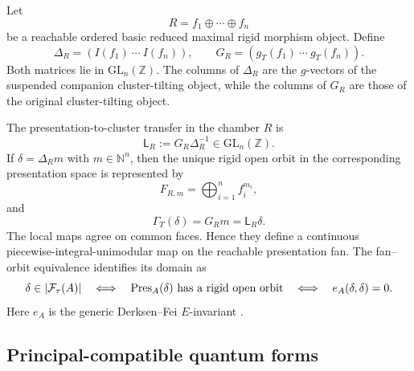 Let
\[
 R=f_1\oplus\cdots\oplus f_n
\]
be a reachable ordered basic reduced maximal rigid morphism object.  Define
\begin{equation}
 \Delta_R=(I(f_1)\ \cdots\ I(f_n)),
 \qquad
 G_R=(g_T(f_1)\ \cdots\ g_T(f_n)).
 \label{eq:Delta-G}
\end{equation}
Both matrices lie in $\mathrm{GL}_n(\mathbb Z)$.  The columns of $\Delta_R$
are the $g$-vectors of the suspended companion cluster-tilting object, while
the columns of $G_R$ are those of the original cluster-tilting object.

The presentation-to-cluster transfer in the chamber $R$ is
\begin{equation}
 \mathsf L_R:=G_R\Delta_R^{-1}\in\mathrm{GL}_n(\mathbb Z).
 \label{eq:chamber-transfer}
\end{equation}
If $\delta=\Delta_Rm$ with $m\in\mathbb N^n$, then the unique rigid open
orbit in the corresponding presentation space is represented by
\[
 F_{R,m}=\bigoplus_{i=1}^nf_i^{m_i},
\]
and
\begin{equation}
 \Gamma_T(\delta)=G_Rm=\mathsf L_R\delta.
 \label{eq:fan-transport}
\end{equation}
The local maps agree on common faces.  Hence they define a continuous
piecewise-integral-unimodular map on the reachable presentation fan.  The
fan--orbit equivalence identifies its domain as
\begin{equation}
 \delta\in\lvert\mathcal F_\tau(A)\rvert
 \quad\Longleftrightarrow\quad
 \operatorname{Pres}_A(\delta)\text{ has a rigid open orbit}
 \quad\Longleftrightarrow\quad
 e_A(\delta,\delta)=0.
 \label{eq:fan-orbit}
\end{equation}
Here $e_A$ is the generic Derksen--Fei $E$-invariant
\cite{DerksenFei,DIJ}.

\subsection{Principal-compatible quantum forms}

